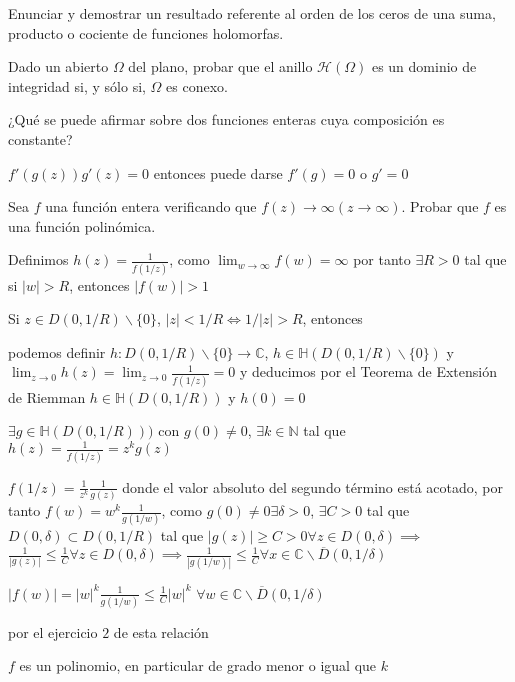 \begin{ejer}
	Enunciar y demostrar un resultado referente al orden de los ceros de una suma, producto o cociente de funciones holomorfas.
\end{ejer}

\begin{ejer}
	Dado un abierto $\Omega$ del plano, probar que el anillo $\mathcal{H}(\Omega)$ es un dominio de integridad si, y sólo si, $\Omega$ es conexo.
\end{ejer}


\begin{ejer}
	¿Qué se puede afirmar sobre dos funciones enteras cuya composición es constante?
\end{ejer}
\begin{sol}
$f'(g(z)) g'(z) = 0 $
entonces puede darse
$f'(g)=0$ o $g'=0$
\end{sol}

\begin{ejer}
	Sea $f$ una función entera verificando que $f(z)\rightarrow\infty (z\rightarrow\infty)$. Probar que $f$ es una función polinómica.
\end{ejer}
\begin{sol}
Definimos
$h(z) = \frac{1}{f(1/z)}$, como $\lim_{w\rightarrow\infty}f(w) = \infty$ por tanto $\exists R>0$ tal que si $|w|>R$, entonces $|f(w)|>1$

Si $z\in D(0,1/R)\backslash\{0\}$, $|z|<1/R \Longleftrightarrow 1/|z|>R$, entonces

podemos definir
$h : D(0,1/R)\backslash\{0\} \rightarrow \mathbb{C}$,
$h\in\mathbb{H}(D(0,1/R)\backslash\{0\})$ y $\lim_{z\rightarrow 0} h(z) = \lim_{z\rightarrow 0} \frac{1}{f(1/z)} = 0$
y deducimos por el Teorema de Extensión de Riemman
$h\in\mathbb{H}(D(0,1/R))$ y $h(0)=0$

$\exists g\in\mathbb{H}(D(0,1/R)))$ con $g(0) \not = 0$, $\exists k\in\mathbb{N}$ tal que $h(z) = \frac{1}{f(1/z)} = z^k g(z)$

$ f(1/z) = \frac{1}{z^k}\frac{1}{g(z)}$
donde el valor absoluto del segundo término está acotado, por tanto
$f(w) = w^k \frac{1}{g(1/w)}$,
como $g(0)\not = 0 \exists\delta>0$, $\exists C>0$ tal que $D(0,\delta)\subset D(0,1/R)$ tal que $|g(z)| \geq C > 0 \forall z\in D(0,\delta) \implies$
$\frac{1}{|g(z)|} \leq \frac{1}{C} \forall z\in D(0,\delta) \implies \frac{1}{|g(1/w)|} \leq \frac{1}{C} \forall x\in \mathbb{C}\backslash \overline{D}(0,1/\delta)$

$|f(w)| = |w|^k \frac{1}{g(1/w)} \leq \frac{1}{C}|w|^k$ $\forall w\in \mathbb{C}\backslash\overline{D}(0,1/\delta)$

por el ejercicio $2$ de esta relación

$f$ es un polinomio, en particular de grado menor o igual que $k$
\end{sol}

